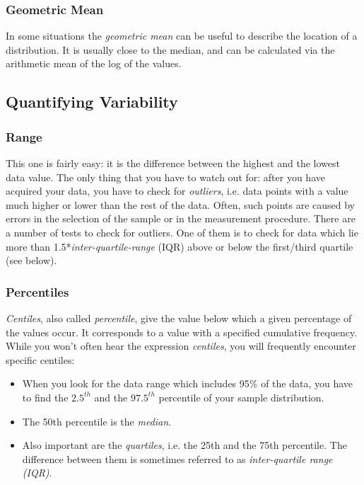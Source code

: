 \subsubsection{Geometric Mean}
In some situations the \emph{geometric mean} can be useful to describe the location of a distribution. It is usually close to the median, and can be calculated via the arithmetic mean of the log of the values.

\subsection{Quantifying Variability}\label{sec:centiles}

\subsubsection{Range}
This one is fairly easy: it is the difference between the highest and the lowest data value.
The only thing that you have to watch out for: after you have acquired your data, you have to check for \emph{outliers}, i.e. data points with a value much higher or lower than the rest of the data. Often, such points are caused by errors in the selection of the sample or in the measurement procedure. There are a number of tests to check for outliers. One of them is to check for data which lie more than 1.5*\emph{inter-quartile-range} (IQR) above or below the first/third quartile (see below).


\subsubsection{Percentiles}

\emph{Centiles}, also called \emph{percentile}, give the value below which a given percentage of the values occur. It corresponds to a value with a specified cumulative frequency. While you won't often hear the expression \emph{centiles}, you will frequently encounter specific centiles:

\begin{itemize}
  \item When you look for the data range which includes 95\% of the data, you have to find the $2.5^{th}$ and the $97.5^{th}$ percentile of your sample distribution.
  \item The 50th percentile is the \emph{median}.
  \item Also important are the \emph{quartiles}, i.e. the 25th and the 75th percentile. The difference between them is sometimes referred to as \emph{inter-quartile range (IQR)}.
\end{itemize}

